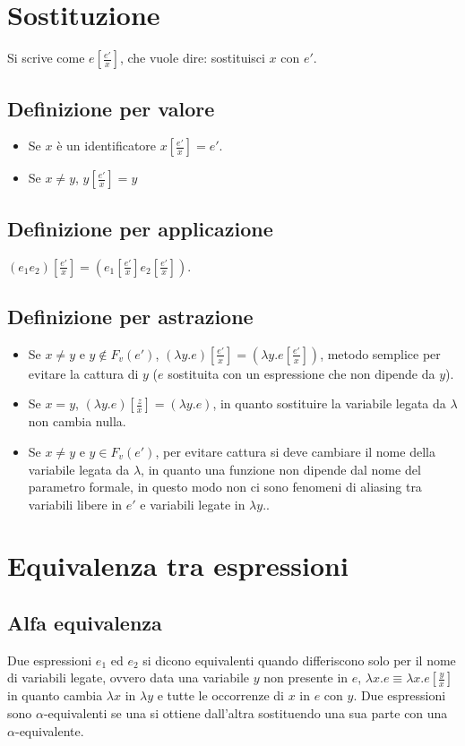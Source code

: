 \section{Sostituzione}
Si scrive come $e[\frac{e'}{x}]$, che vuole dire: sostituisci $x$ con $e'$. 
\subsection{Definizione per valore}
\begin{itemize}
\item Se $x$ \`e un identificatore $x[\frac{e'}{x}]=e'$.
\item Se $x\neq y$, $y[\frac{e'}{x}]=y$
\end{itemize}
\subsection{Definizione per applicazione}
$(e_1e_2)[\frac{e'}{x}]=(e_1[\frac{e'}{x}]e_2[\frac{e'}{x}])$.
\subsection{Definizione per astrazione}
\begin{itemize}
\item Se $x\neq y$ e $y\not\in F_v(e')$, $(\lambda y.e)[\frac{e'}{x}]=(\lambda y.e[\frac{e'}{x}])$, metodo semplice per evitare la cattura di $y$ ($e$ sostituita con un 
espressione che non dipende da $y$).
\item Se $x=y$, $(\lambda y.e)[\frac{z}{x}]=(\lambda y.e)$, in quanto sostituire la variabile legata da $\lambda$ non cambia nulla. 
\item Se $x\neq y$ e $y\in F_v(e')$, per evitare cattura si deve cambiare il nome della variabile legata da $\lambda$, in quanto una funzione non dipende dal nome del parametro
formale, in questo modo non ci sono fenomeni di aliasing tra variabili libere in $e'$ e variabili legate in $\lambda y.$.
\end{itemize}
\section{Equivalenza tra espressioni}
\subsection{Alfa equivalenza}
Due espressioni $e_1$ ed $e_2$ si dicono equivalenti quando differiscono solo per il nome di variabili legate, ovvero data una variabile $y$ non presente in $e$,  $\lambda x.e\equiv \lambda x.e[\frac{y}{x}]$ in quanto cambia $\lambda x$ in $\lambda y$ e tutte le occorrenze di $x$ in $e$ con $y$. Due espressioni sono $\alpha$-equivalenti se una si 
ottiene dall'altra sostituendo una sua parte con una $\alpha$-equivalente. 
